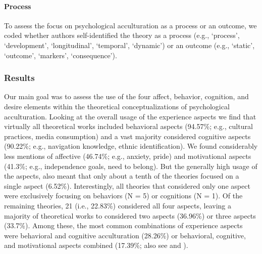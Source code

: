 \paragraph{Process}

To assess the focus on psychological acculturation as a process or an
outcome, we coded whether authors self-identified the theory as a
process (e.g., `process', `development', `longitudinal', `temporal',
`dynamic') or an outcome (e.g., `static', `outcome', `markers',
`consequence').

\subsubsection{Results}

Our main goal was to assess the use of the four affect, behavior,
cognition, and desire elements within the theoretical conceptualizations
of psychological acculturation. Looking at the overall usage of the
experience aspects we find that virtually all theoretical works included
behavioral aspects (94.57\%; e.g., cultural practices, media
consumption) and a vast majority considered cognitive aspects (90.22\%;
e.g., navigation knowledge, ethnic identification). We found
considerably less mentions of affective (46.74\%; e.g., anxiety, pride)
and motivational aspects (41.3\%; e.g., independence goals, need to
belong). But the generally high usage of the aspects, also meant that
only about a tenth of the theories focused on a single aspect (6.52\%).
Interestingly, all theories that considered only one aspect were
exclusively focusing on behaviors (N = 5) or cognitions (N = 1). Of the
remaining theories, 21 (i.e., 22.83\%) considered all four aspects,
leaving a majority of theoretical works to considered two aspects
(36.96\%) or three aspects (33.7\%). Among these, the most common
combinations of experience aspects were behavioral and cognitive
acculturation (28.26\%) or behavioral, cognitive, and motivational
aspects combined (17.39\%; also see  and
).

